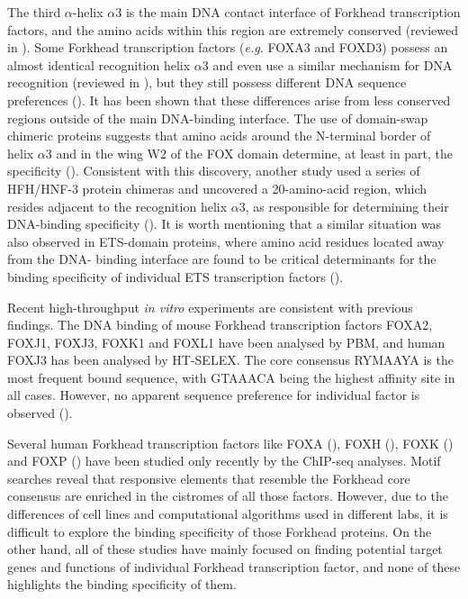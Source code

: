 The third $\alpha$-helix $\alpha 3$ is the main DNA contact interface of Forkhead transcription factors, and the amino acids within this region are extremely conserved (reviewed in \cite{hannenhalli2009the}). Some Forkhead transcription factors (\textit{e.g.} FOXA3 and FOXD3) possess an almost identical recognition helix $\alpha 3$ and even use a similar mechanism for DNA recognition (reviewed in \cite{obsil2008structure/function}), but they still possess different DNA sequence preferences (\cite{overdier1994the}). It has been shown that these differences arise from less conserved regions outside of the main DNA-binding interface. The use of domain-swap chimeric proteins suggests that amino acids around the N-terminal border of helix $\alpha 3$ and in the wing W2 of the FOX domain determine, at least in part, the specificity (\cite{pierrou1994cloning}). Consistent with this discovery, another study used a series of HFH/HNF-3 protein chimeras and uncovered a 20-amino-acid region, which resides adjacent to the recognition helix $\alpha 3$, as responsible for determining their DNA-binding specificity (\cite{overdier1994the}). It is worth mentioning that a similar situation was also observed in ETS-domain proteins, where amino acid residues located away from the DNA- binding interface are found to be critical determinants for the binding specificity of individual ETS transcription factors (\cite{shore1996determinants}).

Recent high-throughput \textit{in vitro} experiments are consistent with previous findings. The DNA binding of mouse Forkhead transcription factors FOXA2, FOXJ1, FOXJ3, FOXK1 and FOXL1 have been analysed by PBM, and human FOXJ3 has been analysed by HT-SELEX. The core consensus RYMAAYA is the most frequent bound sequence, with GTAAACA being the highest affinity site in all cases. However, no apparent sequence preference for individual factor is observed (\cite{badis2009diversity,jolma2010multiplexed}).

Several human Forkhead transcription factors like FOXA (\cite{hurtado2011foxa1,motallebipour2009differential}), FOXH (\cite{kim2011chromatin}), FOXK (\cite{grant2012live-cell,ji2012the}) and FOXP (\cite{gabut2011an,katoh2011foxp3}) have been studied only recently by the ChIP-seq analyses. Motif searches reveal that responsive elements that resemble the Forkhead core consensus are enriched in the cistromes of all those factors. However, due to the differences of cell lines and computational algorithms used in different labs, it is difficult to explore the binding specificity of those Forkhead proteins. On the other hand, all of these studies have mainly focused on finding potential target genes and functions of individual Forkhead transcription factor, and none of these highlights the binding specificity of them.


